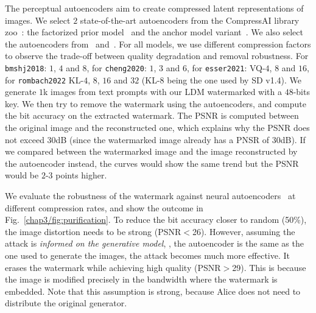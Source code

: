 The perceptual autoencoders aim to create compressed latent representations of images.
We select $2$ state-of-the-art autoencoders from the CompressAI library zoo~\citep{begaint2020compressai}: the factorized prior model~\citep{balle2018variational} and the anchor model variant~\citep{cheng2020learned}.
We also select the autoencoders from~\citet{esser2021taming} and~\citet{rombach2022high}.
For all models, we use different compression factors to observe the trade-off between quality degradation and removal robustness.
For \texttt{bmshj2018}: $1$, $4$ and $8$, for \texttt{cheng2020}: $1$, $3$ and $6$, for \texttt{esser2021}: VQ-$4$, $8$ and $16$, for \texttt{rombach2022} KL-$4$, $8$, $16$ and $32$ (KL-$8$ being the one used by SD v1.4).
We generate $1$k images from text prompts with our LDM watermarked with a $48$-bits key.
We then try to remove the watermark using the autoencoders, and compute the bit accuracy on the extracted watermark.
The PSNR is computed between the original image and the reconstructed one, which explains why the PSNR does not exceed $30$dB (since the watermarked image already has a PNSR of $30$dB).
If we compared between the watermarked image and the image reconstructed by the autoencoder instead, the curves would show the same trend but the PSNR would be $2$-$3$ points higher.

We evaluate the robustness of the watermark against neural autoencoders~\citep{balle2018variational, cheng2020learned, esser2021taming, rombach2022high} at different compression rates, and show the outcome in Fig.~\ref{chap3/fig:purification}.
To reduce the bit accuracy closer to random (50\%), the image distortion needs to be strong (PSNR$<$26).
However, assuming the attack is \emph{informed on the generative model}, \ie, the autoencoder is the same as the one used to generate the images, the attack becomes much more  effective.
It erases the watermark while achieving high quality (PSNR$>$29).
This is because the image is modified precisely in the bandwidth where the watermark is embedded.
Note that this assumption is strong, because Alice does not need to distribute the original generator. 



